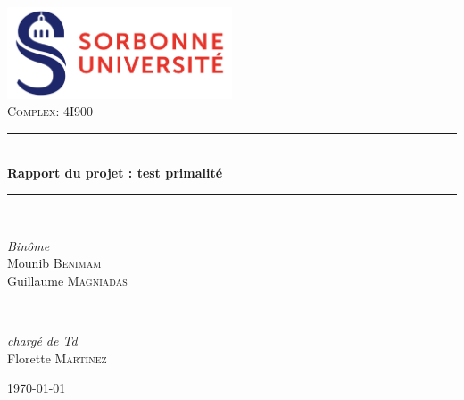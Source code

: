 \documentclass{article}
\begin{document}
\begin{titlepage} 
	\newcommand{\HRule}{\rule{\linewidth}{0.5mm}} %
	
	\center %
	
	
	\includegraphics[width=0.5\textwidth]{logo.png}\\[1cm] 
	\textsc{\Large Complex: 4I900}\\[0.5cm] %
	
	
	\HRule\\[0.4cm]
	
	{\huge\bfseries Rapport du projet : test primalité}\\[0.4cm] %
	
	\HRule\\[1.5cm]
	
	
	\begin{minipage}{0.4\textwidth}
		\begin{flushleft}
			\large
			\textit{Binôme}\\
			Mounib \textsc{Benimam}\\ %
			Guillaume \textsc{Magniadas}\\
		\end{flushleft}
	\end{minipage}
	~
	\begin{minipage}{0.4\textwidth}
		\begin{flushright}
			\large
			\textit{chargé de Td}\\
			Florette \textsc{Martinez} %
		\end{flushright}
	\end{minipage}
	
	
	\vfill\vfill\vfill %
	
	{\large\today} 
	
	
	\vfill 
	
\end{titlepage}
\end{document}
